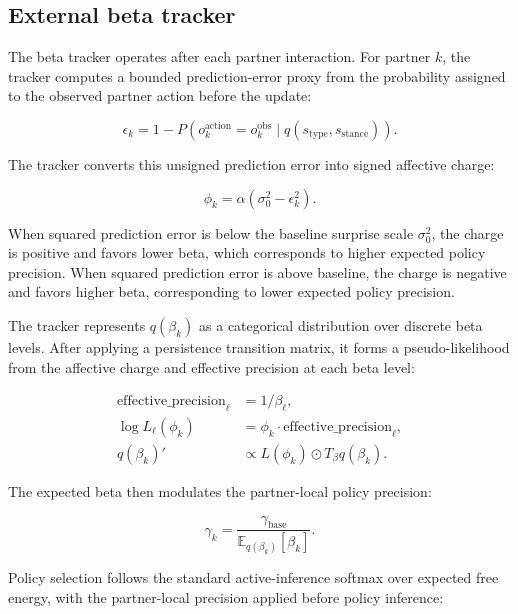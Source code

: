 \subsection{External beta tracker}

The beta tracker operates after each partner interaction. For partner $k$, the tracker computes a bounded prediction-error proxy from the probability assigned to the observed partner action before the update:

\begin{equation}
\epsilon_k = 1 - P(o^{\mathrm{action}}_k = o^{\mathrm{obs}}_k \mid q(s_{\mathrm{type}},s_{\mathrm{stance}})).
\end{equation}

The tracker converts this unsigned prediction error into signed affective charge:

\begin{equation}
\phi_k = \alpha(\sigma_0^2 - \epsilon_k^2).
\end{equation}

When squared prediction error is below the baseline surprise scale $\sigma_0^2$, the charge is positive and favors lower beta, which corresponds to higher expected policy precision. When squared prediction error is above baseline, the charge is negative and favors higher beta, corresponding to lower expected policy precision.

The tracker represents $q(\beta_k)$ as a categorical distribution over discrete beta levels. After applying a persistence transition matrix, it forms a pseudo-likelihood from the affective charge and effective precision at each beta level:

\begin{align}
\mathrm{effective\_precision}_\ell &= 1 / \beta_\ell, \\
\log L_\ell(\phi_k) &= \phi_k \cdot \mathrm{effective\_precision}_\ell, \\
q(\beta_k)' &\propto L(\phi_k) \odot T_\beta q(\beta_k).
\end{align}

The expected beta then modulates the partner-local policy precision:

\begin{equation}
\gamma_k = \frac{\gamma_{\mathrm{base}}}{\mathbb{E}_{q(\beta_k)}[\beta_k]}.
\end{equation}

Policy selection follows the standard active-inference softmax over expected free energy, with the partner-local precision applied before policy inference:

